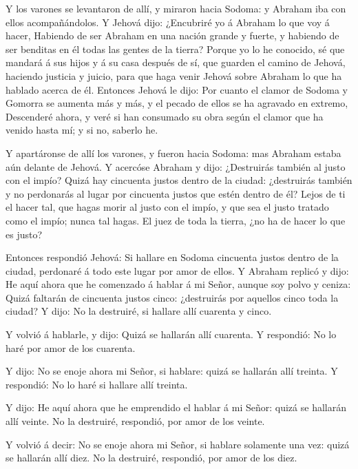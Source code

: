  Y los varones se levantaron de allí, y miraron hacia
Sodoma: y Abraham iba con ellos acompañándolos.  Y Jehová
dijo: ¿Encubriré yo á Abraham lo que voy á hacer,  Habiendo
de ser Abraham en una nación grande y fuerte, y habiendo de ser benditas
en él todas las gentes de la tierra?  Porque yo lo he
conocido, sé que mandará á sus hijos y á su casa después de sí, que
guarden el camino de Jehová, haciendo justicia y juicio, para que haga
venir Jehová sobre Abraham lo que ha hablado acerca de él. 
Entonces Jehová le dijo: Por cuanto el clamor de Sodoma y Gomorra se
aumenta más y más, y el pecado de ellos se ha agravado en extremo,
 Descenderé ahora, y veré si han consumado su obra según el
clamor que ha venido hasta mí; y si no, saberlo he.

 Y apartáronse de allí los varones, y fueron hacia Sodoma:
mas Abraham estaba aún delante de Jehová.  Y acercóse
Abraham y dijo: ¿Destruirás también al justo con el impío? 
Quizá hay cincuenta justos dentro de la ciudad: ¿destruirás también y no
perdonarás al lugar por cincuenta justos que estén dentro de él?
 Lejos de ti el hacer tal, que hagas morir al justo con el
impío, y que sea el justo tratado como el impío; nunca tal hagas. El
juez de toda la tierra, ¿no ha de hacer lo que es justo?

 Entonces respondió Jehová: Si hallare en Sodoma cincuenta
justos dentro de la ciudad, perdonaré á todo este lugar por amor de
ellos.  Y Abraham replicó y dijo: He aquí ahora que he
comenzado á hablar á mi Señor, aunque soy polvo y ceniza: 
Quizá faltarán de cincuenta justos cinco: ¿destruirás por aquellos cinco
toda la ciudad? Y dijo: No la destruiré, si hallare allí cuarenta y
cinco.

 Y volvió á hablarle, y dijo: Quizá se hallarán allí
cuarenta. Y respondió: No lo haré por amor de los cuarenta.

 Y dijo: No se enoje ahora mi Señor, si hablare: quizá se
hallarán allí treinta. Y respondió: No lo haré si hallare allí treinta.

 Y dijo: He aquí ahora que he emprendido el hablar á mi
Señor: quizá se hallarán allí veinte. No la destruiré, respondió, por
amor de los veinte.

 Y volvió á decir: No se enoje ahora mi Señor, si hablare
solamente una vez: quizá se hallarán allí diez. No la destruiré,
respondió, por amor de los diez.

